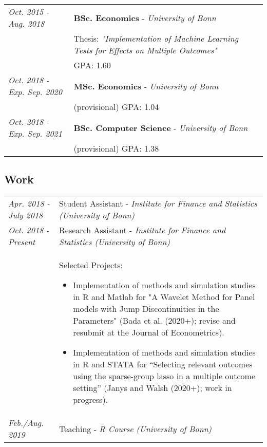 \documentclass{article}
\begin{document}
\begin{table}[h!]
\renewcommand{\arraystretch}{1.25}
    \begin{tabular}{p{125pt} p{350pt}}
         \textit{Oct. 2015 - Aug. 2018} & \textbf{BSc. Economics} - \textit{University of Bonn} \hfill \\
         \hfill &  \vspace*{-15pt} \small Thesis: \textit{"Implementation of Machine Learning Tests for Effects on Multiple Outcomes"}  \\
         \hfill &  \vspace*{-20pt} \small GPA: 1.60 \hfill \\
         \textit{Oct. 2018 - Exp. Sep. 2020} &  \textbf{MSc. Economics} - \textit{University of Bonn} \hfill \\ \hfill &  \vspace*{-15pt} \small (provisional) GPA: 1.04 \hfill  \\
         \textit{Oct. 2018 - Exp. Sep. 2021} &  \textbf{BSc. Computer Science} - \textit{University of Bonn} \hfill \\ \hfill &  \vspace*{-15pt} \small (provisional) GPA: 1.38  
    \end{tabular}
\end{table}

\subsection*{Work}

\begin{table}[h!]
\renewcommand{\arraystretch}{1.25}
    \begin{tabular}{p{125pt} p{350pt}}
         \textit{Apr. 2018 - July 2018} &  Student Assistant - \textit{Institute for Finance and Statistics (University of Bonn)} \\
         \textit{Oct. 2018 - Present} & Research Assistant - \textit{Institute for Finance and Statistics (University of Bonn)} \\
	 \hfill & \vspace*{-13pt} \small{Selected Projects: \begin{itemize}
             \item Implementation of methods and simulation studies in R and Matlab for "A Wavelet Method for Panel models with Jump Discontinuities in the Parameters" (Bada et al. (2020+); revise and resubmit at the Journal of Econometrics).
             \item Implementation of methods and simulation studies in R and STATA for “Selecting relevant outcomes using the sparse-group lasso in a multiple outcome setting” (Janys and Walsh (2020+); work in progress).
         \end{itemize}} \\
	     \textit{Feb./Aug. 2019} & Teaching - \textit{R Course (University of Bonn)} \\
    \end{tabular}
\end{table}
\end{document}
